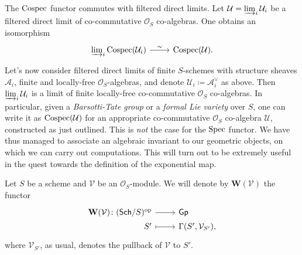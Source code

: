 \begin{rem}
	The \(\operatorname{Cospec}\) functor commutes with filtered direct limits.
	Let $\mathcal{U} = \varinjlim_i \mathcal{U}_i$ be a filtered direct limit
	of co-commutative \(\mathcal{O}_{ S }\) co-algebras.
	One obtains an isomorphism
	\begin{equation*}
	\begin{tikzcd}[row sep = 0ex
		,/tikz/column 1/.append style={anchor=base east}
		,/tikz/column 2/.append style={anchor=base west}]
		\varinjlim_i \cospec(\mathcal{U}_i) \arrow[r, "\sim", rightarrow] &
		\cospec(\mathcal{U})
	.\end{tikzcd}
	\end{equation*} 
	Let's now consider filtered direct limits of 
	finite $S$-schemes with structure sheaves $\mathcal{A}_i$,
	finite and locally-free $\mathcal{O}_{ S }$-algebras, 
	and denote $\mathcal{U}_i \coloneqq \mathcal{A}_i^\vee$ as above.
	Then $\varinjlim_i \mathcal{U}_i$ is a limit 
	of finite locally-free co-commutative $\mathcal{O}_{ S }$ co-algebras.
	In particular, given a \emph{Barsotti-Tate group} or a \emph{formal Lie variety}
	over $S$, one can write it as $\operatorname{Cospec}(\mathcal{U})$ for an appropriate 
	co-commutative $\mathcal{O}_{ S }$ co-algebra $\mathcal{U}$, constructed as just outlined.
	This is \emph{not} the case for the \(\operatorname{Spec}\) functor.
	We have thus managed to associate an algebraic invariant to
	our geometric objects, on which we can carry out computations.
	This will turn out to be extremely useful in the quest towards
	the definition of the exponential map.
\end{rem}


\begin{defn}\label{defn:fppfSheafAssociatedtoMod}
	Let $S$ be a scheme and $\mathcal{V}$ be an $\mathcal{O}_{ S }$-module.
	We will denote by $\mathbf{W}(\mathcal{V})$ the functor
	\begin{equation*}
	\begin{tikzcd}[row sep = 0ex
		,/tikz/column 1/.append style={anchor=base east}
		,/tikz/column 2/.append style={anchor=base west}]
		\mathbf{W}(\mathcal{V})\colon 
		(\mathsf{Sch}/S)^{\mathrm{op}} \arrow[r, "", rightarrow] &
		\mathsf{Gp} \\
		S' \arrow[r, "", mapsto] & 
		\Gamma(S', \mathcal{V}_{S'})
	,\end{tikzcd}
	\end{equation*} 
	where $\mathcal{V}_{S'}$, as usual, denotes the pullback of
	$\mathcal{V}$ to $S'$.
\end{defn}


